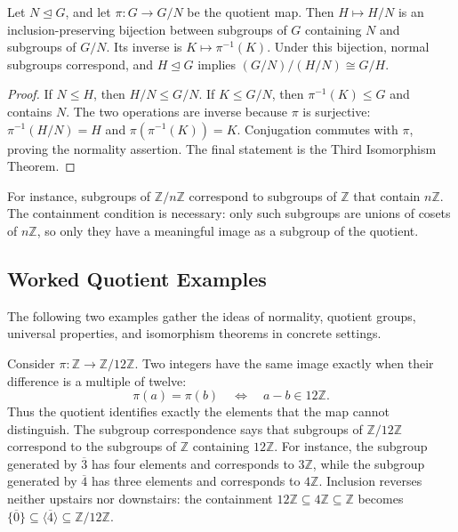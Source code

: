 \begin{theorem}
Let \(N\trianglelefteq G\), and let \(\pi:G\to G/N\) be the quotient map.
Then \(H\mapsto H/N\) is an inclusion-preserving bijection between subgroups
of \(G\) containing \(N\) and subgroups of \(G/N\).  Its inverse is
\(K\mapsto\pi^{-1}(K)\).  Under this bijection, normal subgroups correspond,
and \(H\trianglelefteq G\) implies \((G/N)/(H/N)\cong G/H\).
\end{theorem}
\begin{proof}
If \(N\leq H\), then \(H/N\leq G/N\).  If \(K\leq G/N\), then
\(\pi^{-1}(K)\leq G\) and contains \(N\).  The two operations are inverse
because \(\pi\) is surjective: \(\pi^{-1}(H/N)=H\) and
\(\pi(\pi^{-1}(K))=K\).  Conjugation commutes with \(\pi\), proving the
normality assertion.  The final statement is the Third Isomorphism Theorem.
\end{proof}

For instance, subgroups of \(\mathbb Z/n\mathbb Z\) correspond to subgroups
of \(\mathbb Z\) that contain \(n\mathbb Z\).  The containment condition is
necessary: only such subgroups are unions of cosets of \(n\mathbb Z\), so only
they have a meaningful image as a subgroup of the quotient.

\subsection*{Worked Quotient Examples}

The following two examples gather the ideas of normality, quotient groups,
universal properties, and isomorphism theorems in concrete settings.

\begin{example}
Consider \(\pi:\mathbb Z\to\mathbb Z/12\mathbb Z\).  Two integers have the
same image exactly when their difference is a multiple of twelve:
\[
\pi(a)=\pi(b)\quad\Longleftrightarrow\quad a-b\in12\mathbb Z.
\]
Thus the quotient identifies exactly the elements that the map cannot
distinguish.  The subgroup correspondence says that subgroups of
\(\mathbb Z/12\mathbb Z\) correspond to the subgroups of \(\mathbb Z\)
containing \(12\mathbb Z\).  For instance, the subgroup generated by
\(\overline3\) has four elements and corresponds to \(3\mathbb Z\), while the
subgroup generated by \(\overline4\) has three elements and corresponds to
\(4\mathbb Z\).  Inclusion reverses neither upstairs nor downstairs: the
containment \(12\mathbb Z\subseteq4\mathbb Z\subseteq\mathbb Z\) becomes
\(\{\overline0\}\subseteq\langle\overline4\rangle\subseteq
\mathbb Z/12\mathbb Z\).
\end{example}

